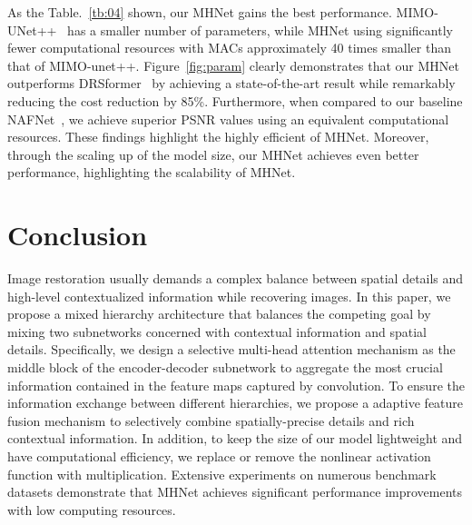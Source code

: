 \documentclass[lettersize,journal]{IEEEtran}
\begin{document}
As the Table.~\ref{tb:04} shown, our MHNet gains the best performance. MIMO-UNet++~\cite{2021Rethinking} has a smaller number of parameters, while MHNet using significantly fewer computational resources with MACs  approximately 40 times smaller than that of MIMO-unet++.  Figure~\ref{fig:param} clearly demonstrates that our MHNet outperforms DRSformer~\cite{DRSformer} by achieving a state-of-the-art result while remarkably reducing the cost reduction by 85\%. Furthermore, when compared to our baseline NAFNet~\cite{chen2022simple}, we achieve superior PSNR values using an equivalent  computational resources. These findings highlight the highly efficient of MHNet. Moreover, through the scaling up of the model size, our MHNet achieves even better performance, highlighting the scalability of MHNet.



\section{Conclusion}
Image restoration usually demands a complex balance between spatial details and high-level contextualized information while recovering images. In this paper, we propose a mixed hierarchy architecture that balances the competing goal by mixing two subnetworks concerned with contextual information and spatial details. Specifically, we design a selective multi-head attention mechanism as the middle block of the encoder-decoder subnetwork to aggregate the most crucial information
contained in the feature maps captured by convolution. To ensure the information exchange between different hierarchies, we propose a adaptive feature fusion mechanism  to selectively combine spatially-precise details and rich contextual information. In addition, to keep the size of our model lightweight and have computational efficiency, we replace or remove the nonlinear activation function with multiplication. Extensive experiments on numerous benchmark datasets demonstrate that MHNet achieves significant performance improvements with low computing resources.
















\vfill
\end{document}
